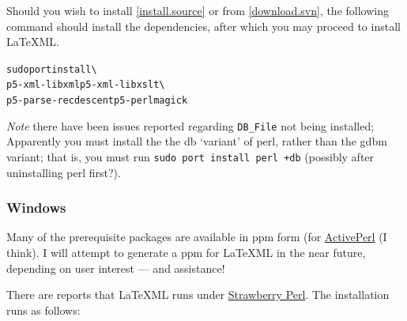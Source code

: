 \documentclass{article}
\begin{document}

Should you wish to install \ref{install.source} or from \ref{download.svn}, the
following command should install the dependencies, after which you may proceed to install LaTeXML.
\begin{alltt}
  sudo port install    \textbackslash\\
      p5-xml-libxml p5-xml-libxslt  \textbackslash\\
      p5-parse-recdescent p5-perlmagick
\end{alltt}

\emph{Note} there have been issues reported regarding \verb|DB_File|
not being installed;  Apparently you must install the 
the db `variant' of perl, rather than the gdbm variant;
that is, you must run \verb|sudo port install perl +db|
(possibly after uninstalling perl first?).

\subsubsection{Windows}\label{install.windows}
Many of the prerequisite packages are available in
ppm form (for \href{http://activestate.com/}{ActivePerl} (I think).
I will attempt to generate a ppm for LaTeXML in the near
future, depending on user interest --- and assistance!

There  are reports that LaTeXML runs under
\href{http://strawberryperl.com}{Strawberry Perl}.
The installation runs as follows:
\end{document}
